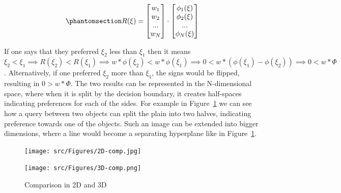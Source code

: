 \documentclass[
  letterpaper,
  numbers=noenddot,
  DIV=11]{scrreprt}
\theoremstyle{plain}
\theoremstyle{definition}
\theoremstyle{plain}
\theoremstyle{remark}
\begin{document}
\begin{equation}\phantomsection\label{eq-reward_eq}{R(\xi) = \begin{bmatrix} w_1 \\ w_2 \\ ... \\ w_N \end{bmatrix} \cdot \begin{bmatrix} \phi_1(\xi) \\ \phi_2(\xi) \\ ... \\ \phi_N(\xi) \end{bmatrix}}\end{equation}

If one says that they preferred \(\xi_2\) less than \(\xi_1\) then it
means
\(\xi_2 < \xi_1 \implies R(\xi_2) < R(\xi_1) \implies w * \phi(\xi_2) < w * \phi(\xi_1) \implies 0 < w * (\phi(\xi_1) - \phi(\xi_2)) \implies 0 < w * \Phi\).
Alternatively, if one preferred \(\xi_2\) more than \(\xi_1\), the signs
would be flipped, resulting in \(0 > w * \Phi\). The two results can be
represented in the N-dimensional space, where when it is split by the
decision boundary, it creates half-spaces indicating preferences for
each of the sides. For example in Figure~\ref{fig-2dcomp} we can see how
a query between two objects can split the plain into two halves,
indicating preference towards one of the objects. Such an image can be
extended into bigger dimensions, where a line would become a separating
hyperplane like in Figure~\ref{fig-2dcomp}.

\begin{figure}

\begin{minipage}{0.50\linewidth}

\texttt{[image: src/Figures/2D-comp.jpg]}

\end{minipage}%
%
\begin{minipage}{0.50\linewidth}

\texttt{[image: src/Figures/3D-comp.png]}

\end{minipage}%

\caption{\label{fig-2dcomp}Comparison in 2D and 3D}

\end{figure}%
\end{document}
